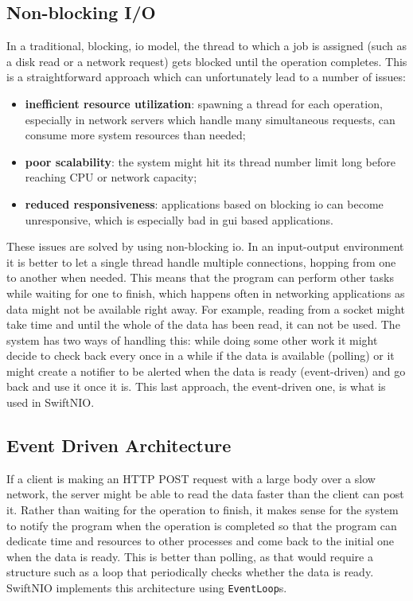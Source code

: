 \subsection{Non-blocking I/O}
In a traditional, blocking, \gls{io} model, the thread to which a job is assigned (such as a disk read or a network request) gets blocked until the operation completes. This is a straightforward approach which can unfortunately lead to a number of issues:
\begin{itemize}
    \item \textbf{inefficient resource utilization}: spawning a thread for each operation, especially in network servers which handle many simultaneous requests, can consume more system resources than needed;
    \item \textbf{poor scalability}: the system might hit its thread number limit long before reaching CPU or network capacity;
    \item \textbf{reduced responsiveness}: applications based on blocking \gls{io} can become unresponsive, which is especially bad in \gls{gui} based applications.
\end{itemize}
These issues are solved by using non-blocking \gls{io}. In an input-output environment it is better to let a single thread handle multiple connections, hopping from one to another when needed. This means that the program can perform other tasks while waiting for one to finish, which happens often in networking applications as data might not be available right away. For example, reading from a socket might take time and until the whole of the data has been read, it can not be used. The system has two ways of handling this: while doing some other work it might decide to check back every once in a while if the data is available (polling) or it might create a notifier to be alerted when the data is ready (event-driven) and go back and use it once it is. \cite{java-networks} This last approach, the event-driven one, is what is used in SwiftNIO. \cite{swiftnio-docs}

\subsection{Event Driven Architecture}
If a client is making an HTTP POST request with a large body over a slow network, the server might be able to read the data faster than the client can post it. Rather than waiting for the operation to finish, it makes sense for the system to notify the program when the operation is completed so that the program can dedicate time and resources to other processes and come back to the initial one when the data is ready. This is better than polling, as that would require a structure such as a  loop that periodically checks whether the data is ready.
\cite{java-networks}
SwiftNIO implements this architecture using \lstinline{EventLoop}s.

